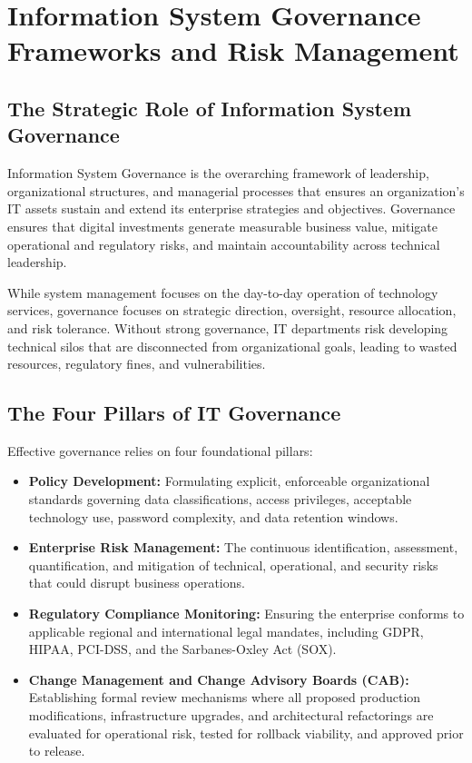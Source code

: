 \documentclass[11pt,a4paper]{article}
\begin{document}
\section{Information System Governance Frameworks and Risk Management}
\label{sec:governance}

\subsection{The Strategic Role of Information System Governance}
Information System Governance is the overarching framework of leadership, organizational structures, and managerial processes that ensures an organization's IT assets sustain and extend its enterprise strategies and objectives. Governance ensures that digital investments generate measurable business value, mitigate operational and regulatory risks, and maintain accountability across technical leadership.

While system management focuses on the day-to-day operation of technology services, governance focuses on strategic direction, oversight, resource allocation, and risk tolerance. Without strong governance, IT departments risk developing technical silos that are disconnected from organizational goals, leading to wasted resources, regulatory fines, and vulnerabilities.

\subsection{The Four Pillars of IT Governance}
Effective governance relies on four foundational pillars:
\begin{itemize}
    \item \textbf{Policy Development:} Formulating explicit, enforceable organizational standards governing data classifications, access privileges, acceptable technology use, password complexity, and data retention windows.
    \item \textbf{Enterprise Risk Management:} The continuous identification, assessment, quantification, and mitigation of technical, operational, and security risks that could disrupt business operations.
    \item \textbf{Regulatory Compliance Monitoring:} Ensuring the enterprise conforms to applicable regional and international legal mandates, including GDPR, HIPAA, PCI-DSS, and the Sarbanes-Oxley Act (SOX).
    \item \textbf{Change Management and Change Advisory Boards (CAB):} Establishing formal review mechanisms where all proposed production modifications, infrastructure upgrades, and architectural refactorings are evaluated for operational risk, tested for rollback viability, and approved prior to release.
\end{itemize}
\end{document}
